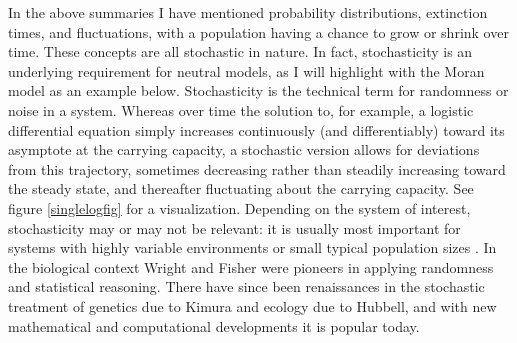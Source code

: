 In the above summaries I have mentioned probability distributions, extinction times, and fluctuations, with a population having a chance to grow or shrink over time. 
These concepts are all stochastic in nature. 
In fact, stochasticity is an underlying requirement for neutral models, as I will highlight with the Moran model as an example below. 
Stochasticity is the technical term for randomness or noise in a system. %
Whereas over time the solution to, for example, a logistic differential equation simply increases continuously (and differentiably) toward its asymptote at the carrying capacity, a stochastic version allows for deviations from this trajectory, sometimes decreasing rather than steadily increasing toward the steady state, and thereafter fluctuating about the carrying capacity. 
See figure \ref{singlelogfig} for a visualization. %
Depending on the system of interest, stochasticity may or may not be relevant: it is usually most important for systems with highly variable environments or small typical population sizes \cite{Nisbet1982,Kimura1983,VanKampen1992,Gardiner2004a,Blythe2007,Ovaskainen2010,Black2012}. 
In the biological context Wright and Fisher were pioneers in applying randomness and statistical reasoning. %
There have since been renaissances in the stochastic treatment of genetics due to Kimura and ecology due to Hubbell, and with new mathematical and computational developments it is popular today. %

